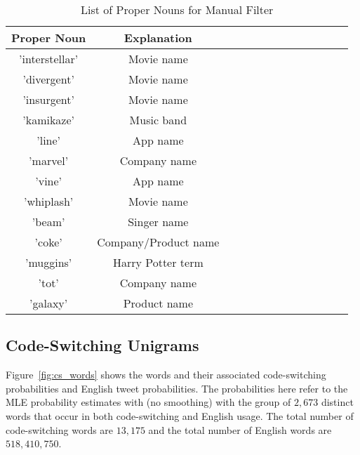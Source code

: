 \documentclass[conference]{IEEEtran}
\begin{document}
\begin{table}[h!] 
 \caption{List of Proper Nouns for Manual Filter}
\centering %
\begin{tabular}{c c c c c c rrrrrrr} %
\hline\hline %
Proper Noun		&	Explanation		
\\ [0.5ex] 
\hline 
'interstellar' 	&	Movie name	\\
'divergent'		&      Movie name       \\ 
'insurgent'		&      Movie name        \\
'kamikaze'		&      Music band        \\ 
'line'			&      App name       \\
'marvel'		&      Company name        \\
'vine'			&      App name        \\ 
'whiplash'		&      Movie name        \\
'beam'		&    	Singer name          \\
'coke'		&      Company/Product name        \\ 
'muggins'		&      Harry Potter term        \\
'tot'			&      Company name       \\
'galaxy'		&	Product name 	\\
\hline %
\end{tabular} 
\label{tab:properNouns} 
\end{table} 












\subsection{Code-Switching Unigrams}


Figure~\ref{fig:cs_words} shows the words and their associated code-switching probabilities and English tweet probabilities. The probabilities here refer to the MLE probability estimates with (no smoothing) with the group of $2,673$ distinct words that occur in both code-switching and English usage. The total number of code-switching words are $13,175$ and the total number of English words are $518,410,750$. 
\end{document}
